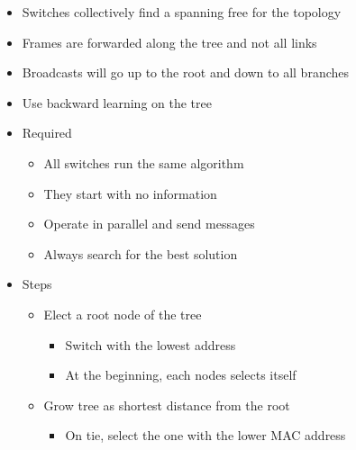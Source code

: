 \begin{itemize}
\begin{itemize}
\begin{itemize}
\begin{itemize}
                            \item Switches collectively find a spanning free for the topology
                            \item Frames are forwarded along the tree and not all links
                            \item Broadcasts will go up to the root and down to all branches
                            \item Use backward learning on the tree
                        \end{itemize}
                        \begin{itemize}
                            \item Required
                                \begin{itemize}
                                    \item All switches run the same algorithm
                                    \item They start with no information
                                    \item Operate in parallel and send messages
                                    \item Always search for the best solution
                                \end{itemize}
                            \item Steps
                                \begin{itemize}
                                    \item Elect a root node of the tree
                                        \begin{itemize}
                                            \item Switch with the lowest address
                                            \item At the beginning, each nodes selects itself
                                        \end{itemize}
                                    \item Grow tree as shortest distance from the root
                                        \begin{itemize}
                                            \item On tie, select the one with the lower MAC address
                                        \end{itemize}

\end{itemize}
\end{itemize}
\end{itemize}
\end{itemize}
\end{itemize}
